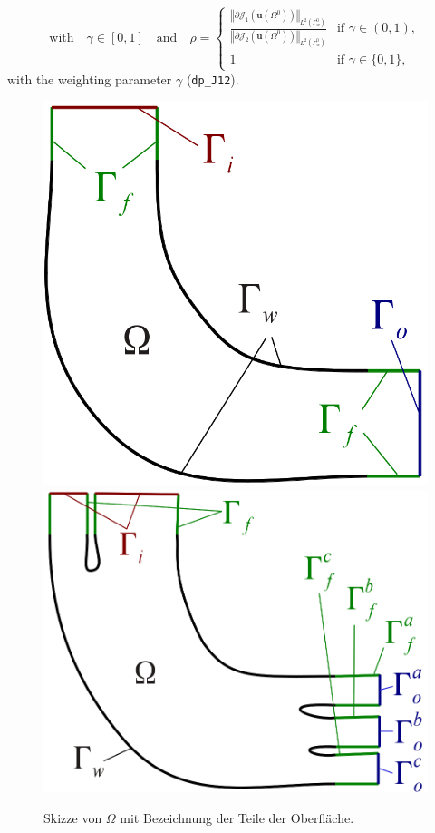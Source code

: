 \documentclass[oneside]{article}
\numberwithin{equation}{section}
\numberwithin{figure}{section}
\newcommand{\Om }{ \Omega}
\newcommand{\buu}{\boldsymbol{u}}
\newcommand{\JJ }{ \mathcal{J}}
\numberwithin{figure}{section}
\begin{document}
\begin{equation*}
\mbox{with} \quad \gamma \in \left[0,1\right] \quad \mbox{and} \quad \rho = \begin{cases}
\frac{\left\Vert\partial \JJ_1 \left(\buu \left( \Om^0 \right) \right) \right\Vert_{L^2\left(\Gamma_w^0\right)}}{\left\Vert\partial \JJ_2\left(\buu \left(\Om^0 \right) \right) \right\Vert_{L^2\left(\Gamma_w^0\right)}} & \mbox{if } \gamma \in \left(0,1\right),\\ 
1 & \mbox{if } \gamma \in \{ 0, 1 \},
\end{cases}
\end{equation*}
with the weighting parameter $\gamma$ (\verb|dp_J12|).
\begin{figure}[htbp]
    \centering
    \includegraphics[scale=0.5]{geometrie_skizze_noInterface.png}
    \includegraphics[scale=0.5]{geometrie_skizze_MultOutlet.png}
    \caption{Skizze von $\Om$ mit Bezeichnung der Teile der Oberfläche.}
    \label{Skizze_extrusion}
\end{figure}
\end{document}
